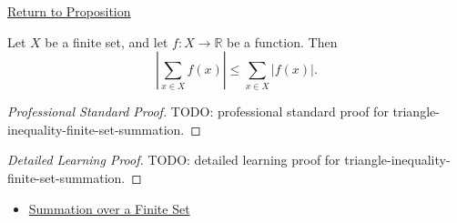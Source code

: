 \newpage
{}
\label{prf:triangle-inequality-finite-set-summation}

\begin{remark*}[Return]
\hyperref[prop:triangle-inequality-finite-set-summation]{Return to Proposition}
\end{remark*}

\begin{proposition*}
Let \(X\) be a finite set, and let \(f:X\to\mathbb{R}\) be a function.
Then
\[
  \left\lvert \sum_{x\in X} f(x) \right\rvert
  \le
  \sum_{x\in X} \lvert f(x)\rvert.
\]
\end{proposition*}

\begin{proof}[Professional Standard Proof]
\LRAProofBodyStart
TODO: professional standard proof for triangle-inequality-finite-set-summation.
\end{proof}

\begin{proof}[Detailed Learning Proof]
\LRAProofBodyStart
TODO: detailed learning proof for triangle-inequality-finite-set-summation.
\end{proof}

\begin{remark*}
\end{remark*}

\begin{dependencies}
\begin{itemize}
  \item \hyperref[def:summation-over-finite-set]{Summation over a Finite Set}
\end{itemize}
\end{dependencies}

\clearpage
